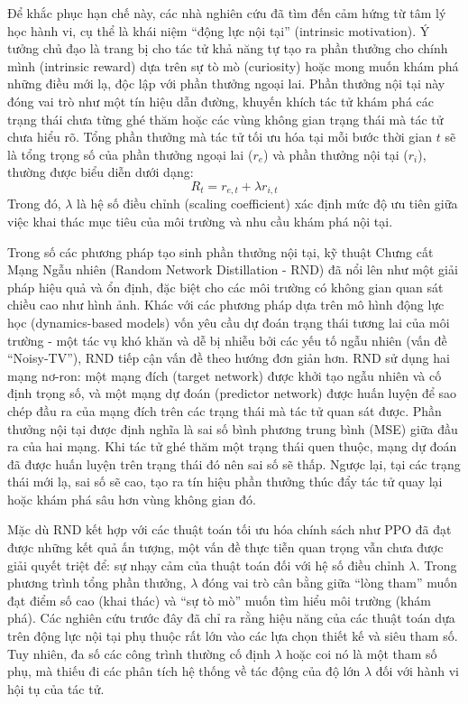 \documentclass{uetgraduation}
\begin{document}
Để khắc phục hạn chế này, các nhà nghiên cứu đã tìm đến cảm hứng từ tâm lý học hành vi, cụ thể là khái niệm ``động lực nội tại'' (intrinsic motivation). Ý tưởng chủ đạo là trang bị cho tác tử khả năng tự tạo ra phần thưởng cho chính mình (intrinsic reward) dựa trên sự tò mò (curiosity) hoặc mong muốn khám phá những điều mới lạ, độc lập với phần thưởng ngoại lai. Phần thưởng nội tại này đóng vai trò như một tín hiệu dẫn đường, khuyến khích tác tử khám phá các trạng thái chưa từng ghé thăm hoặc các vùng không gian trạng thái mà tác tử chưa hiểu rõ. Tổng phần thưởng mà tác tử tối ưu hóa tại mỗi bước thời gian $t$ sẽ là tổng trọng số của phần thưởng ngoại lai ($r_e$) và phần thưởng nội tại ($r_i$), thường được biểu diễn dưới dạng:
\begin{equation}
R_t = r_{e,t} + \lambda r_{i,t}
\end{equation}
Trong đó, $\lambda$ là hệ số điều chỉnh (scaling coefficient) xác định mức độ ưu tiên giữa việc khai thác mục tiêu của môi trường và nhu cầu khám phá nội tại.

Trong số các phương pháp tạo sinh phần thưởng nội tại, kỹ thuật Chưng cất Mạng Ngẫu nhiên (Random Network Distillation - RND) \cite{burda2019} đã nổi lên như một giải pháp hiệu quả và ổn định, đặc biệt cho các môi trường có không gian quan sát chiều cao như hình ảnh. Khác với các phương pháp dựa trên mô hình động lực học (dynamics-based models) vốn yêu cầu dự đoán trạng thái tương lai của môi trường - một tác vụ khó khăn và dễ bị nhiễu bởi các yếu tố ngẫu nhiên (vấn đề ``Noisy-TV''), RND tiếp cận vấn đề theo hướng đơn giản hơn. RND sử dụng hai mạng nơ-ron: một mạng đích (target network) được khởi tạo ngẫu nhiên và cố định trọng số, và một mạng dự đoán (predictor network) được huấn luyện để sao chép đầu ra của mạng đích trên các trạng thái mà tác tử quan sát được. Phần thưởng nội tại được định nghĩa là sai số bình phương trung bình (MSE) giữa đầu ra của hai mạng. Khi tác tử ghé thăm một trạng thái quen thuộc, mạng dự đoán đã được huấn luyện trên trạng thái đó nên sai số sẽ thấp. Ngược lại, tại các trạng thái mới lạ, sai số sẽ cao, tạo ra tín hiệu phần thưởng thúc đẩy tác tử quay lại hoặc khám phá sâu hơn vùng không gian đó.

Mặc dù RND kết hợp với các thuật toán tối ưu hóa chính sách như PPO đã đạt được những kết quả ấn tượng, một vấn đề thực tiễn quan trọng vẫn chưa được giải quyết triệt để: sự nhạy cảm của thuật toán đối với hệ số điều chỉnh $\lambda$. Trong phương trình tổng phần thưởng, $\lambda$ đóng vai trò cân bằng giữa ``lòng tham'' muốn đạt điểm số cao (khai thác) và ``sự tò mò'' muốn tìm hiểu môi trường (khám phá). Các nghiên cứu trước đây \cite{andres2022} đã chỉ ra rằng hiệu năng của các thuật toán dựa trên động lực nội tại phụ thuộc rất lớn vào các lựa chọn thiết kế và siêu tham số. Tuy nhiên, đa số các công trình thường cố định $\lambda$ hoặc coi nó là một tham số phụ, mà thiếu đi các phân tích hệ thống về tác động của độ lớn $\lambda$ đối với hành vi hội tụ của tác tử.
\end{document}
